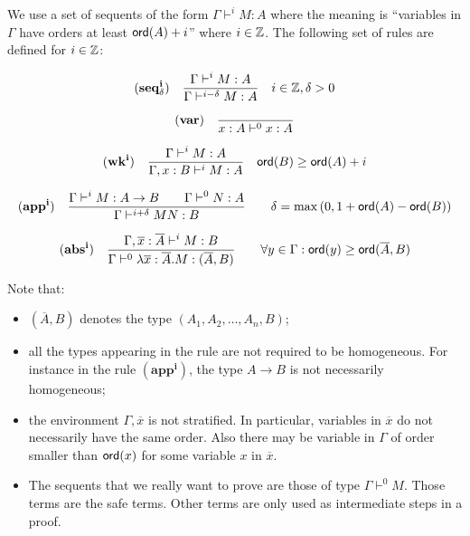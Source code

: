 

We use a set of sequents of the form $\Gamma \vdash^{i} M : A$ where
the meaning is ``variables in $\Gamma$ have orders at least
${\sf ord}(A)+i$'' where $i \in \mathbb{Z}$. The following set of rules are
defined for $i \in \mathbb{Z}$:

$$ \mathbf{(seq^i_\delta)} \quad \frac{\displaystyle \Gamma \vdash^{i} M : A}{\Gamma \vdash^{i-\delta} M : A} \quad i \in \mathbb{Z}, \delta > 0  $$

$$ \mathbf{(var)} \quad  \frac{\displaystyle }{x : A\vdash^{0} x : A} $$

$$ \mathbf{(wk^i)} \quad  \frac{\displaystyle \Gamma \vdash^i M : A}{\Gamma , x : B \vdash^i M : A} \quad {\sf ord}(B) \geq {\sf ord}(A) + i $$

$$ \mathbf{(app^i)} \quad  \frac{\displaystyle \Gamma \vdash^i M : A\rightarrow B
                                        \qquad \Gamma \vdash^{0} N : A}{\Gamma  \vdash^{i+\delta} M N : B}
                                    \qquad
                                   \delta = \max\left(0, 1 + {\sf ord}(A) - {\sf ord}(B)\right)$$

$$ \mathbf{(abs^i)} \quad  \frac{\displaystyle \Gamma, \overline{x} : \overline{A} \vdash^{i} M : B}{\Gamma  \vdash^{0} \lambda \overline{x} : \overline{A} . M : (\overline{A},B)} \qquad
                                   \forall y \in \Gamma : {\sf ord}(y) \geq {\sf ord}(\overline{A},B)$$


Note that:
\begin{itemize}
\item $(\overline{A},B)$ denotes the type $(A_1,A_2, \ldots, A_n, B)$;
\item all the types appearing in the rule are not required to be homogeneous. For instance in the rule $\mathbf{(app^i)}$, the type $A \rightarrow B$ is not necessarily
homogeneous;
\item the environment $\Gamma, \overline{x}$ is not stratified. In particular, variables in $\overline{x}$ do not necessarily have the same order. Also
there may be variable in $\Gamma$ of order smaller than ${\sf ord}(x)$
for some variable $x$ in $\overline{x}$.
\item The sequents that we really want to prove are those of type $\Gamma \vdash^0 M$. Those terms are the safe terms.
Other terms are only used as intermediate steps in a proof.
\end{itemize}


